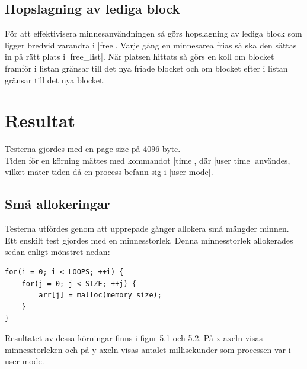 \documentclass[paper=a4, fontsize=11pt]{scrartcl} %
\numberwithin{equation}{section} %
\numberwithin{figure}{section} %
\numberwithin{table}{section} %
\begin{document}
\subsection{Hopslagning av lediga block}
För att effektivisera minnesanvändningen så görs hopslagning av lediga block
som ligger bredvid varandra i |free|.
Varje gång en minnesarea frias så ska den sättas in på rätt plats i |free_list|.
När platsen hittats så görs en koll om blocket framför i listan gränsar till
det nya friade blocket och om blocket efter i listan gränsar till det nya
blocket.


\section{Resultat}

Testerna gjordes med en page size på 4096 byte.\\
Tiden för en körning mättes med kommandot |time|, där |user time| användes,
vilket mäter tiden då en process befann sig i |user mode|.

\subsection{Små allokeringar}

Testerna utfördes genom att upprepade gånger allokera små mängder minnen.
Ett enskilt test gjordes med en minnesstorlek.
Denna minnesstorlek allokerades sedan enligt mönstret nedan:

\begin{verbatim}
for(i = 0; i < LOOPS; ++i) {
    for(j = 0; j < SIZE; ++j) {
        arr[j] = malloc(memory_size);
    }
}
\end{verbatim}

Resultatet av dessa körningar finns i figur 5.1 och 5.2.
På x-axeln visas minnesstorleken och på y-axeln visas antalet millisekunder som
processen var i user mode.
\end{document}
